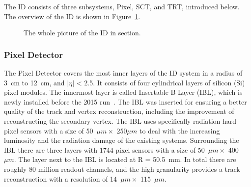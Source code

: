 The ID consists of three subsystems, Pixel, SCT, and TRT, introduced below.
The overview of the ID is shown in Figure~\ref{fig:ID}.
\begin{figure}[tbp]
\begin{center}
\caption{
The whole picture of the ID in section.
}
\label{fig:ID}
\end{center}
\end{figure}

\subsubsection{Pixel Detector}
The Pixel Detector covers the most inner layers of the ID system in a radius of 3~cm to 12~cm, and $|\eta|$ < 2.5. 
It consists of four cylindrical layers of silicon (Si) pixel modules.
The innermost layer is called Insertable B-Layer (IBL), which is newly installed before the 2015 run~\cite{PIX-2018-001}. 
The IBL was inserted for ensuring a better quality of the track and vertex reconstruction, including the improvement of reconstructing the secondary vertex.
The IBL uses specifically radiation hard pixel sensors with a size of 50~$\mu m \times$ 250$\mu m$ to deal with the increasing luminosity and the radiation damage of the existing systems. 
Surrounding the IBL there are three layers with 1744 pixel sensors with a size of 50~$\mu m \times$ 400~$\mu m$. 
The layer next to the IBL is located at R = 50.5~mm. In total there are roughly 80 million readout channels, and the high granularity provides a track reconstruction with a resolution of 14~$\mu m  \times$ 115~$\mu m$.


